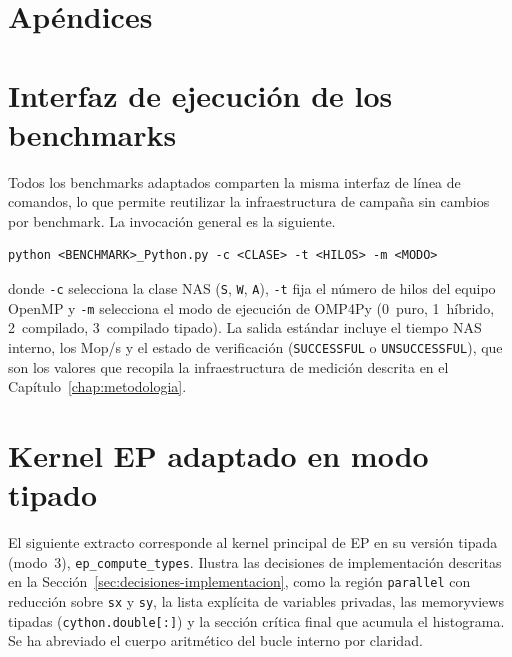 \newpage
\chapter*{Apéndices}
\thispagestyle{empty}
\newpage

\chapter{Interfaz de ejecución de los benchmarks}
\label{anexo:interfaz}

Todos los benchmarks adaptados comparten la misma interfaz de línea de comandos,
lo que permite reutilizar la infraestructura de campaña sin cambios por
benchmark. La invocación general es la siguiente.

\begin{verbatim}
python <BENCHMARK>_Python.py -c <CLASE> -t <HILOS> -m <MODO>
\end{verbatim}

donde \texttt{-c} selecciona la clase NAS (\texttt{S}, \texttt{W}, \texttt{A}),
\texttt{-t} fija el número de hilos del equipo OpenMP y \texttt{-m} selecciona el
modo de ejecución de OMP4Py (0~puro, 1~híbrido, 2~compilado, 3~compilado
tipado). La salida estándar incluye el tiempo NAS interno, los Mop/s y el estado
de verificación (\texttt{SUCCESSFUL} o \texttt{UNSUCCESSFUL}), que son los
valores que recopila la infraestructura de medición descrita en el
Capítulo~\ref{chap:metodologia}.


\chapter{Kernel EP adaptado en modo tipado}
\label{anexo:kernel-ep}

El siguiente extracto corresponde al kernel principal de EP en su versión
tipada (modo~3), \texttt{ep\_compute\_types}. Ilustra las decisiones de
implementación descritas en la Sección~\ref{sec:decisiones-implementacion}, como la
región \texttt{parallel} con reducción sobre \texttt{sx} y \texttt{sy}, la lista
explícita de variables privadas, las memoryviews tipadas
(\texttt{cython.double[:]}) y la sección crítica final que acumula el histograma.
Se ha abreviado el cuerpo aritmético del bucle interno por claridad.

